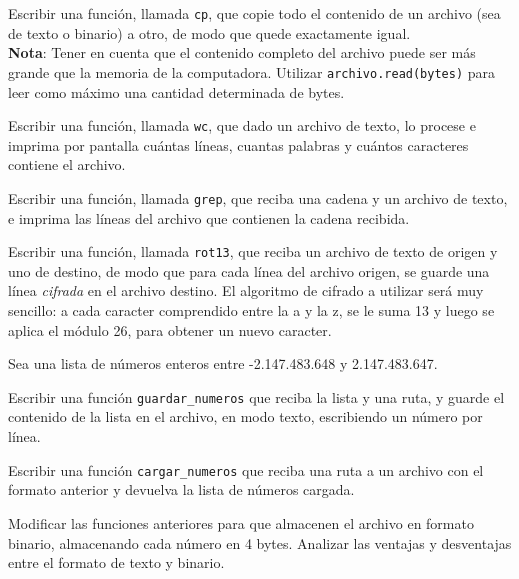 \begin{ejercicio}
Escribir una función, llamada \lstinline|cp|, que copie todo el contenido de un
archivo (sea de texto o binario) a otro, de modo que quede exactamente igual.\\
{\bf Nota}: Tener en cuenta que el contenido completo del archivo puede ser más
grande que la memoria de la computadora. Utilizar
\lstinline!archivo.read(bytes)! para leer como máximo una cantidad
determinada de bytes.
\end{ejercicio}

\begin{ejercicio}
Escribir una función, llamada \lstinline|wc|, que dado un archivo de texto, lo procese e
imprima por pantalla cuántas líneas, cuantas palabras y cuántos caracteres
contiene el archivo.
\end{ejercicio}

\begin{ejercicio}
Escribir una función, llamada \lstinline|grep|, que reciba una cadena y un
archivo de texto, e imprima las líneas del archivo que contienen la cadena
recibida.
\end{ejercicio}

\begin{ejercicio}
Escribir una función, llamada \lstinline|rot13|, que reciba un archivo de texto de
origen y uno de destino, de modo que para cada línea del archivo origen, se
guarde una línea \emph{cifrada} en el archivo destino.  El algoritmo de cifrado
a utilizar será muy sencillo: a cada caracter comprendido entre la a y la z, se
le suma 13 y luego se aplica el módulo 26, para obtener un nuevo caracter.
\end{ejercicio}

\begin{ejercicio}
Sea una lista de números enteros entre -2.147.483.648 y 2.147.483.647.
\begin{partes}
  \item Escribir una función \lstinline!guardar_numeros! que reciba la lista
    y una ruta, y guarde el contenido de la lista en el archivo,
    en modo texto, escribiendo un número por línea.
  \item Escribir una función \lstinline!cargar_numeros! que reciba una ruta
    a un archivo con el formato anterior y devuelva la lista de números cargada.
  \item Modificar las funciones anteriores para que almacenen el archivo en formato
    binario, almacenando cada número en 4 bytes. Analizar las ventajas y
    desventajas entre el formato de texto y binario.
\end{partes}
\end{ejercicio}

